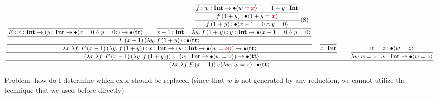 \documentclass{article}
\begin{document}
\begin{equation*}
    \dfrac{
    \dfrac{
        \dfrac{
            \dfrac{
                    \dfrac{
                    }{
                    F \mathbin{:} {x} : \textbf{Int} \to ({y} : \textbf{Int} \to \bullet \langle x = 0 \wedge y = 0 \rangle) \to \bullet \langle \textbf{tt} \rangle
                    }
                    \qquad
                    \dfrac{}{
                    x - 1 \mathbin{:} \textbf{Int}
                    }
                \quad
                \dfrac{
                    \dfrac{
                        \dfrac{
                            \dfrac{}{
                                f \mathbin{:} {w} : \textbf{Int} \to \bullet \langle w=\textcolor{red}{\boldsymbol x} \rangle
                            }
                            \qquad
                            \dfrac{}{
                                1+y \mathbin{:} \textbf{Int}
                            }
                        }{
                            f\,(1+y) \mathbin{:} \bullet \langle 1+y=\textcolor{red}{\boldsymbol x} \rangle
                        }
                    } {
                        f\,(1+y) \mathbin{:} \bullet \langle x - 1 = 0 \wedge y = 0 \rangle
                    }\text{(S)}
                } {
                    \lambda y.\: f\,(1+y) \mathbin{:} {y} : \textbf{Int} \to \bullet \langle x - 1 = 0 \wedge y = 0 \rangle
                }
            }{
                F\, (x-1)\, (\lambda y.\: f\,(1+y))  \mathbin{:} \bullet \langle \textbf{tt} \rangle
            }
        }{
            \lambda x. \lambda f.\: F\, (x-1)\, (\lambda y.\: f\,(1+y)) \mathbin{:} {x} : \textbf{Int} \to ({w} : \textbf{Int} \to \bullet \langle w = \textcolor{red}{\boldsymbol x} \rangle) \to \bullet \langle \textbf{tt} \rangle
        }
        \quad
        \dfrac{}{
        z \mathbin{:} \textbf{Int}
        }
        }{
            (\lambda x. \lambda f.\: F\, (x-1)\, (\lambda y.\: f\,(1+y)))\, z \mathbin{:} ({w} : \textbf{Int} \to \bullet \langle w = z \rangle) \to \bullet \langle \textbf{tt} \rangle
        }
        \qquad 
        \dfrac{
            w = z \mathbin{:} \bullet \langle  w = z \rangle
        }{
            \lambda w. w = z \mathbin{:} {w} : \textbf{Int} \to \bullet \langle w = z \rangle
        }
    }{
        (\lambda x. \lambda f. F\, (x-1))\, z (\lambda w.\: w = z) \mathbin{:} \bullet \langle \textbf{tt} \rangle
    }
\end{equation*}

Problem: how do I determine which expr should be replaced
(since that \( w \) is not generated by any reduction, we cannot utilize the technique that we used before directly)
\end{document}
